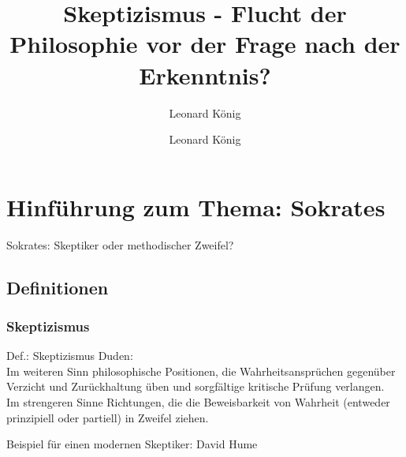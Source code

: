 \documentclass[12pt]{beamer}
\author{Leonard König}
\title{Skeptizismus - Flucht der Philosophie vor der Frage nach der Erkenntnis?}
\author{Leonard König}
\begin{document}
\begin{frame}
\titlepage
\end{frame}



\section{Hinführung zum Thema: Sokrates}
\begin{frame}
Sokrates: Skeptiker oder methodischer Zweifel?
\end{frame}

	\subsection{Definitionen}
		\subsubsection{Skeptizismus}
\begin{frame}{Def.: Skeptizismus}
Duden:\\
\glqq Im weiteren Sinn philosophische Positionen, die Wahrheitsansprüchen gegenüber Verzicht und Zurückhaltung üben und sorgfältige kritische Prüfung verlangen.\\
Im strengeren Sinne Richtungen, die die Beweisbarkeit von Wahrheit (entweder prinzipiell oder partiell) in Zweifel ziehen.\grqq

Beispiel für einen modernen Skeptiker: David Hume
\end{frame}		
\end{document}
